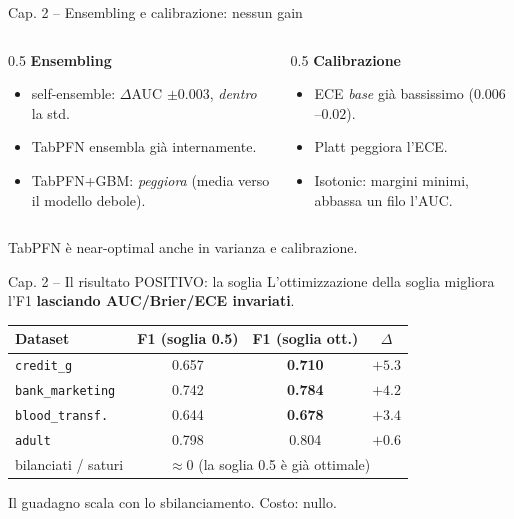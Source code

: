 \documentclass[11pt,aspectratio=169]{beamer}
\begin{document}
\begin{frame}{Cap. 2 -- Ensembling e calibrazione: nessun gain}
\begin{columns}[T]
\begin{column}{0.5\textwidth}
\textbf{Ensembling}
\begin{itemize}\small
  \item self-ensemble: $\Delta$AUC $\pm0.003$, \emph{dentro} la std.
  \item TabPFN ensembla già internamente.
  \item TabPFN+GBM: \emph{peggiora} (media verso il modello debole).
\end{itemize}
\end{column}
\begin{column}{0.5\textwidth}
\textbf{Calibrazione}
\begin{itemize}\small
  \item ECE \emph{base} già bassissimo ($0.006$--$0.02$).
  \item Platt \alert{peggiora} l'ECE.
  \item Isotonic: margini minimi, abbassa un filo l'AUC.
\end{itemize}
\end{column}
\end{columns}
\vfill
\centering
\alert{TabPFN è near-optimal anche in varianza e calibrazione.}
\end{frame}

\begin{frame}{Cap. 2 -- Il risultato POSITIVO: la soglia}
L'ottimizzazione della soglia migliora l'F1 \textbf{lasciando AUC/Brier/ECE invariati}.
\vfill
\begin{table}
\centering\small
\begin{tabular}{lccc}
\toprule
Dataset & F1 (soglia 0.5) & F1 (soglia ott.) & $\Delta$ \\
\midrule
\texttt{credit\_g}      & 0.657 & \textbf{0.710} & $+5.3$ \\
\texttt{bank\_marketing}& 0.742 & \textbf{0.784} & $+4.2$ \\
\texttt{blood\_transf.} & 0.644 & \textbf{0.678} & $+3.4$ \\
\texttt{adult}          & 0.798 & 0.804 & $+0.6$ \\
\midrule
bilanciati / saturi     & \multicolumn{3}{c}{$\approx 0$ (la soglia 0.5 è già ottimale)} \\
\bottomrule
\end{tabular}
\end{table}
\vfill
\centering
Il guadagno \alert{scala con lo sbilanciamento}. Costo: nullo.
\end{frame}
\end{document}
